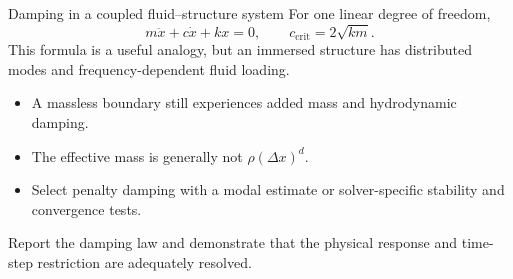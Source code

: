 \documentclass[aspectratio=169,11pt]{beamer}
\begin{document}
\begin{frame}{Damping in a coupled fluid--structure system}
For one linear degree of freedom,
\[
  m\ddot{x}+c\dot{x}+kx=0,
  \qquad
  c_{\mathrm{crit}}=2\sqrt{km}.
\]
This formula is a useful analogy, but an immersed structure has distributed modes and frequency-dependent fluid loading.

\begin{itemize}\itemsep5pt
  \item A massless boundary still experiences added mass and hydrodynamic damping.
  \item The effective mass is generally not $\rho(\Delta x)^d$.
  \item Select penalty damping with a modal estimate or solver-specific stability and convergence tests.
\end{itemize}

\begin{punchbox}
\small Report the damping law and demonstrate that the physical response and time-step restriction are adequately resolved.
\end{punchbox}
\end{frame}
\end{document}
